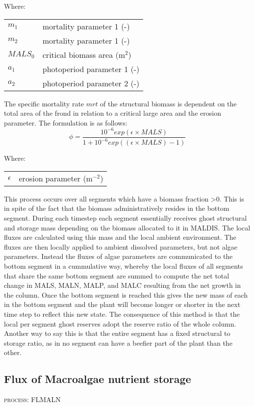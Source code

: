 \documentclass{deltares_manual}
\begin{document}
Where:\\
\begin{tabular}{ll}
$m_1$    & mortality parameter 1 (-)\\
$m_2$    & mortality parameter 1 (-)\\
$MALS_0$ & critical biomass area (m$^2$)\\
$a_1$    & photoperiod parameter 1 (-)\\
$a_2$    & photoperiod parameter 2 (-)\\
\end{tabular}
The specific mortality rate $mrt$ of the structural biomass is dependent on the total area of the frond in relation to a critical large area and the erosion parameter. The formulation is as follows:
\[\phi = \frac{10^{-6}exp(\epsilon\times MALS)}{1+10^{-6}exp((\epsilon\times MALS)-1)}\]

Where:\\
\begin{tabular}{ll}
$\epsilon$ & erosion parameter (m$^{-2}$)\\
\end{tabular}

This process occurs over all segments which have a biomass fraction \textgreater 0. This is in spite of the fact that the biomass administratively resides in the bottom segment. During each timestep each segment essentially receives ghost structural and storage mass depending on the biomass allocated to it in MALDIS. The local fluxes are calculated using this mass and the local ambient environment. The fluxes are then locally applied to ambient dissolved parameters, but not algae parameters. Instead the fluxes of algae parameters are communicated to the bottom segment in a cummulative way, whereby the local fluxes of all segments that share the same bottom segment are summed to compute the net total change in MALS, MALN, MALP, and MALC resulting from the net growth in the column. Once the bottom segment is reached this gives the new mass of each in the bottom segment and the plant will  become longer or shorter in the next time step to reflect this new state. The consequence of this method is that the local per segment ghost reserves adopt the reserve ratio of the whole column. Another way to say this is that the entire segment has a fixed structural to storage ratio, as in no segment can have a beefier part of the plant than the other.

\subsection{Flux of Macroalgae nutrient storage}
\begin{flushright}
\textsc{process: FLMALN}
\end{flushright}
\end{document}
